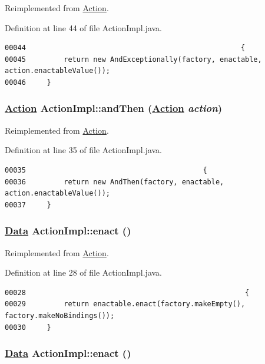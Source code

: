 Reimplemented from \hyperlink{interfaceAction_a6}{Action}.

Definition at line 44 of file Action\-Impl.java.\footnotesize\begin{verbatim}00044                                                   {
00045         return new AndExceptionally(factory, enactable, action.enactableValue());
00046     }
\end{verbatim}\normalsize 
\hypertarget{classActionImpl_a13}{
\subsubsection[andThen]{\setlength{\rightskip}{0pt plus 5cm}\hyperlink{interfaceAction}{Action} Action\-Impl::and\-Then (\hyperlink{interfaceAction}{Action} {\em action})}}
\label{classActionImpl_a13}




Reimplemented from \hyperlink{interfaceAction_a3}{Action}.

Definition at line 35 of file Action\-Impl.java.\footnotesize\begin{verbatim}00035                                          {
00036         return new AndThen(factory, enactable, action.enactableValue());
00037     }
\end{verbatim}\normalsize 
\hypertarget{classActionImpl_a11}{
\subsubsection[enact]{\setlength{\rightskip}{0pt plus 5cm}\hyperlink{interfaceData}{Data} Action\-Impl::enact ()}}
\label{classActionImpl_a11}




Reimplemented from \hyperlink{interfaceAction_a1}{Action}.

Definition at line 28 of file Action\-Impl.java.\footnotesize\begin{verbatim}00028                                                    {
00029         return enactable.enact(factory.makeEmpty(), factory.makeNoBindings());
00030     }   
\end{verbatim}\normalsize 
\hypertarget{classActionImpl_a1}{
\subsubsection[enact]{\setlength{\rightskip}{0pt plus 5cm}\hyperlink{interfaceData}{Data} Action\-Impl::enact ()}}
\label{classActionImpl_a1}





